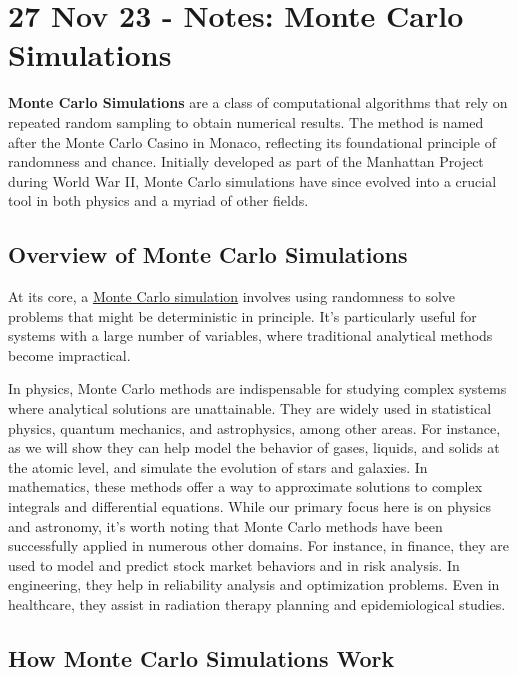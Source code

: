 \section{27 Nov 23 - Notes: Monte Carlo
Simulations}\label{nov-23---notes-monte-carlo-simulations}

\textbf{Monte Carlo Simulations} are a class of computational algorithms
that rely on repeated random sampling to obtain numerical results. The
method is named after the Monte Carlo Casino in Monaco, reflecting its
foundational principle of randomness and chance. Initially developed as
part of the Manhattan Project during World War II, Monte Carlo
simulations have since evolved into a crucial tool in both physics and a
myriad of other fields.

\subsection{Overview of Monte Carlo
Simulations}\label{overview-of-monte-carlo-simulations}

At its core, a
\href{https://en.wikipedia.org/wiki/Monte_Carlo_method}{Monte Carlo
simulation} involves using randomness to solve problems that might be
deterministic in principle. It's particularly useful for systems with a
large number of variables, where traditional analytical methods become
impractical.

In physics, Monte Carlo methods are indispensable for studying complex
systems where analytical solutions are unattainable. They are widely
used in statistical physics, quantum mechanics, and astrophysics, among
other areas. For instance, as we will show they can help model the
behavior of gases, liquids, and solids at the atomic level, and simulate
the evolution of stars and galaxies. In mathematics, these methods offer
a way to approximate solutions to complex integrals and differential
equations. While our primary focus here is on physics and astronomy,
it's worth noting that Monte Carlo methods have been successfully
applied in numerous other domains. For instance, in finance, they are
used to model and predict stock market behaviors and in risk analysis.
In engineering, they help in reliability analysis and optimization
problems. Even in healthcare, they assist in radiation therapy planning
and epidemiological studies.

\subsection{How Monte Carlo Simulations
Work}\label{how-monte-carlo-simulations-work}

